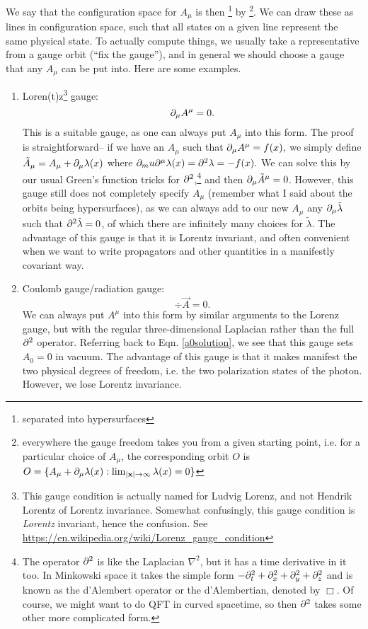 We say that the configuration space for $A_\mu$ is then \footnote{separated into hypersurfaces} by \footnote{everywhere the gauge freedom takes you from a given starting point, i.e. for a particular choice of $A_\mu$, the corresponding orbit $O$ is $O=\{A_\mu+\partial_\mu \lambda(x): \lim_{|\boldsymbol{\mathbf{x}}|\to \infty }\lambda(x)=0\}$}. We can draw these as lines in configuration space, such that all states on a given line represent the same physical state. To actually compute things, we usually take a representative from a gauge orbit (``fix the gauge''), and in general we should choose a gauge that any $A_\mu$ can be put into. Here are some examples.
\begin{enumerate}
    \item Loren(t)z\footnote{This gauge condition is actually named for Ludvig Lorenz, and not Hendrik Lorentz of Lorentz invariance. Somewhat confusingly, this gauge condition is \emph{Lorentz} invariant, hence the confusion. See \url{https://en.wikipedia.org/wiki/Lorenz_gauge_condition}} gauge:
    $$\partial_\mu A^\mu=0.$$
    This is a suitable gauge, as one can always put $A_\mu$ into this form. The proof is straightforward-- if we have an $A_\mu$ such that $\partial_\mu A^\mu=f(x),$ we simply define $\tilde A_\mu=A_\mu+\partial_\mu \lambda(x)$ where $\partial_mu \partial^\mu \lambda(x)=\partial^2 \lambda =-f(x).$ We can solve this by our usual Green's function tricks for $\partial^2$,\footnote{The operator $\partial^2$ is like the Laplacian $\nabla^2$, but it has a time derivative in it too. In Minkowski space it takes the simple form $-\partial_t^2+\partial_x^2+\partial_y^2+\partial_z^2$ and is known as the d'Alembert operator or the d'Alembertian, denoted by $\Box$. Of course, we might want to do QFT in curved spacetime, so then $\partial^2$ takes some other more complicated form.} and then $\partial_\mu \tilde A^\mu=0$. However, this gauge still does not completely specify $A_\mu$ (remember what I said about the orbits being hypersurfaces), as we can always add to our new $A_\mu$ any $\partial_\mu \tilde \lambda$ such that $\partial^2 \tilde \lambda=0$, of which there are infinitely many choices for $\tilde \lambda$. The advantage of this gauge is that it is Lorentz invariant, and often convenient when we want to write propagators and other quantities in a manifestly covariant way.
    \item Coulomb gauge/radiation gauge:
    $$\div \vec A=0.$$
    We can always put $A^\mu$ into this form by similar arguments to the Lorenz gauge, but with the regular three-dimensional Laplacian rather than the full $\partial^2$ operator. Referring back to Eqn. \ref{a0solution}, we see that this gauge sets $A_0=0$ in vacuum. The advantage of this gauge is that it makes manifest the two physical degrees of freedom, i.e. the two polarization states of the photon. However, we lose Lorentz invariance.
\end{enumerate}

